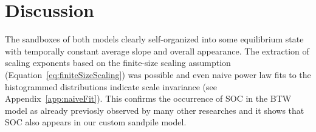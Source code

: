 

\section{Discussion}
\label{sec:discussion}

The sandboxes of both models clearly self-organized into some equilibrium state with temporally constant average slope
and overall appearance. The extraction of scaling exponents based on the finite-size scaling assumption
(Equation~\eqref{eq:finiteSizeScaling}) was possible and even naive power law fits to the histogrammed distributions
indicate scale invariance (see Appendix~\ref{app:naiveFit}).
This confirms the occurrence of SOC in the BTW model as already previosly observed by many other researches
and it shows that SOC also appears in our custom sandpile model.

